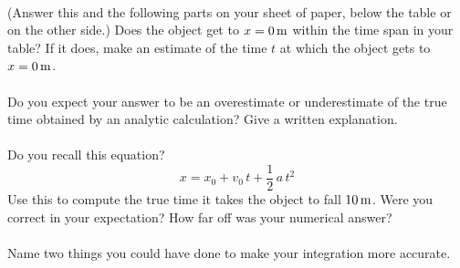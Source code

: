 \documentclass[12pt]{article}
\begin{document}
\paragraph{\theproblem}%
(Answer this and the following parts on your sheet of paper, below the
table or on the other side.)  Does the object get to $x=0\,\mathrm{m}$ within
the time span in your table?  If it does, make an estimate of the time
$t$ at which the object gets to $x=0\,\mathrm{m}$.

\paragraph{\theproblem}%
Do you expect your answer to be an overestimate or underestimate of
the true time obtained by an analytic calculation?  Give a written
explanation.

\paragraph{\theproblem}%
Do you recall this equation?
\begin{equation}
x = x_0 + v_0\,t + \frac{1}{2}\,a\,t^2
\end{equation}
Use this to compute the true time it takes the object to fall
$10\,\mathrm{m}$.  Were you correct in your expectation?  How far off was your
numerical answer?

\paragraph{\theproblem}%
Name two things you could have done to make your integration more
accurate.
\end{document}
